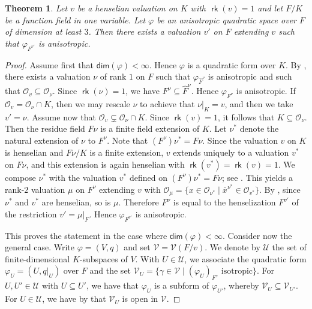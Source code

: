 \documentclass[twoside,11pt]{amsart}
\numberwithin{equation}{section}
\newtheorem{thm}[equation]{Theorem}
\theoremstyle{definition}
\renewcommand{\dim}{\operatorname{\mathsf{dim}}}
\newcommand{\vf}{\varphi}
\newcommand\rk{\operatorname{\mathsf{rk}}}
\newcommand{\mc}{\mathcal}
\renewcommand{\dim}{\mathsf{dim}}
\begin{document}
\begin{thm}\label{Mehmeti-infinite}
    Let $v$ be a henselian valuation on $K$ with $\rk(v)=1$ and let $F/K$ be a function field in one variable. 
    Let $\vf$ be an anisotropic quadratic space over $F$ of dimension at least $3$. Then there exists a valuation $v'$ on $F$ extending $v$ such that $\vf_{F^{v'}}$ is anisotropic.
\end{thm}
\begin{proof}
    Assume first that $\dim(\vf)<\infty$.
    Hence $\vf$ is a quadratic form over $K$.
    By \cite[Theorem 4.4]{BDGMZ23}, there exists a valuation $\nu$ of rank $1$ on $F$ such that $\vf_{\hat{F}^\nu}$ is anisotropic and such that $\mc{O}_v\subseteq\mc{O}_\nu$. 
    Since $\rk(\nu)=1$, we have $F^\nu\subseteq\hat{F}^\nu$.
    Hence $\vf_{F^\nu}$ is anisotropic.
    If $\mc{O}_v=\mc{O}_\nu\cap K$, then we may rescale $\nu$ to achieve that $\nu|_K=v$, and then we take $v'=\nu$. 
    Assume now that 
    $\mc{O}_v\subsetneq \mc{O}_{\nu}\cap K$.
    Since $\rk(v)=1$, it follows that $K\subseteq\mc{O}_{\nu}$.
    Then the residue field $F\nu$ is a finite field extension of $K$. 
    Let $\nu^*$ denote the natural extension of $\nu$ to $F^\nu$. 
    Note that $(F^\nu)\nu^*=F\nu$.
    Since the valuation $v$ on $K$ is  henselian and $F\nu/K$ is a finite extension, $v$ extends uniquely to a valuation $v^\ast$ on $F\nu$, and this extension is again henselian with $\rk(v^\ast)=\rk(v)=1$.
     We compose $\nu^\ast$ with the valuation $v^\ast$ defined on $(F^\nu)\nu^\ast=F\nu$; see \cite[p.~45]{EP05}. This yields a rank-$2$ valuation $\mu$ on $F^\nu$ extending $v$ with 
     $\mc{O}_{\mu} = \{x \in \mc{O}_{\nu^\ast} \mid \bar{x}^{\nu^\ast} \in \mc{O}_{v^\ast}\}$.
     By \cite[Cor.~4.1.4]{EP05}, since $\nu^\ast$ and $v^\ast$ are henselian, so is $\mu$.
     Therefore $F^\nu$ is equal to the henselization $F^{v'}$ of the restriction $v'=\mu|_F$.
     Hence
     $\vf_{F^{v'}}$ is anisotropic.

This proves the statement in the case where $\dim(\vf)<\infty$.
Consider now the general case. Write $\vf=(V,q)$ and set $\mc{V}=\mc{V}(F/v)$.
We denote by $\mc{U}$ the set of finite-dimensional $K$-subspaces of $V$.
With $U\in \mc{U}$, we associate the quadratic form $\vf_{U}=(U,q|_{U})$ over $F$ and the set $\mc{V}_U=\{\gamma\in \mc{V
} \mid (\vf_U)_{F^{\gamma}}   \mbox{ isotropic}\}$. 
For $U,U'\in\mc{U}$ with $U\subseteq U'$, we have that $\vf_U$ is a subform of $\vf_{U'}$, whereby $\mc{V}_{U}\subseteq \mc{V}_{U'}$. 
For $U\in\mc{U}$, we have by \cite[Lemma 8.1]{BDD25} that $\mc{V}_U$ is open in $\mc{V}$. 


\end{proof}
\end{document}
